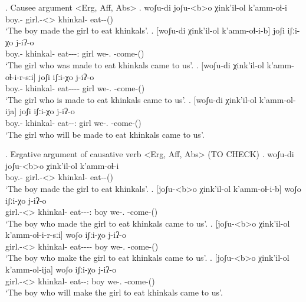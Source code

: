 \ex. Causee argument <Erg, Aff, Abs>
	\ag. woʃu-di joʃu-<b>o χink'il-ol k'amm-oɬ-i\\
			{boy.\Obl-\Erg} {girl.\Obl-<\Nanf>\Aff} {khinkal-\Pl} {eat-\Caus-\Pst(\Aor)}\\
			\glt `The boy made the girl to eat khinkals'.
	\bg. [woʃu-di χink'il-ol k'amm-oɬ-i-b] joʃi iʃːi-χo j-iʔ-o\\
			{boy.\Obl-\Erg} {khinkal-\Pl} {eat-\Caus-\Pst-\Ptcp:\Pst} girl {we-\Add.\Lat} {\F-come-\Pst(\Aor)}\\
			\glt `The girl who was made to eat khinkals came to us'.
	\bg. [woʃu-di χink'il-ol k'amm-oɬ-i-r-sːi] joʃi iʃːi-χo j-iʔ-o\\
			{boy.\Obl-\Erg} {khinkal-\Pl} {eat-\Caus-\Pst-\Prog-\Attr} girl {we-\Add.\Lat} {\F-come-\Pst(\Aor)}\\
			\glt `The girl who is made to eat khinkals came to us'.			
	\bg. [woʃu-di χink'il-ol k'amm-ol-ija] joʃi iʃːi-χo j-iʔ-o\\
			{boy.\Obl-\Erg} {khinkal-\Pl} {eat-\Caus-\Ptcp:\Fut} girl {we-\Add.\Lat} {\F-come-\Pst(\Aor)}\\
			\glt `The girl who will be made to eat khinkals came to us'.

\ex. Ergative argument of causative verb <Erg, Aff, Abs> (TO CHECK)
	\ag. woʃu-di joʃu-<b>o χink'il-ol k'amm-oɬ-i\\
			{boy.\Obl-\Erg} {girl.\Obl-<\Nanf>\Aff} {khinkal-\Pl} {eat-\Caus-\Pst(\Aor)}\\
			\glt `The boy made the girl to eat khinkals'.
	\bg. [joʃu-<b>o χink'il-ol k'amm-oɬ-i-b] woʃo iʃːi-χo j-iʔ-o\\
			{girl.\Obl-<\Nanf>\Aff} {khinkal-\Pl} {eat-\Caus-\Pst-\Ptcp:\Pst} boy {we-\Add.\Lat} {\F-come-\Pst(\Aor)}\\
			\glt `The boy who made the girl to eat khinkals came to us'.
	\bg. [joʃu-<b>o χink'il-ol k'amm-oɬ-i-r-sːi] woʃo iʃːi-χo j-iʔ-o\\
			{girl.\Obl-<\Nanf>\Aff} {khinkal-\Pl} {eat-\Caus-\Pst-\Prog-\Attr} boy {we-\Add.\Lat} {\F-come-\Pst(\Aor)}\\
			\glt `The boy who make the girl to eat khinkals came to us'.
	\bg. [joʃu-<b>o χink'il-ol k'amm-ol-ija] woʃo iʃːi-χo j-iʔ-o\\
			{girl.\Obl-<\Nanf>\Aff} {khinkal-\Pl} {eat-\Caus-\Ptcp:\Fut} boy {we-\Add.\Lat} {\F-come-\Pst(\Aor)}\\
			\glt `The boy who will make the girl to eat khinkals came to us'.


